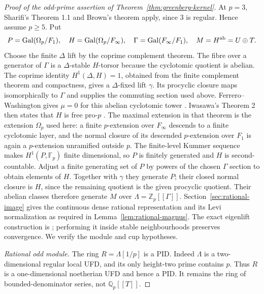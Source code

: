 \documentclass[11pt]{article}
\theoremstyle{definition}
\numberwithin{equation}{section}
\begin{document}
\begin{proof}[Proof of the odd-prime assertion of Theorem~\ref{thm:greenberg-kernel}]
At $p=3$, Sharifi's Theorem 1.1 and Brown's theorem apply, since $3$ is regular. Hence
assume $p\ge5$. Put
\begin{equation}
 P=\operatorname{Gal}(\Omega_p/F_1),\quad
 H=\operatorname{Gal}(\Omega_p/F_\infty),\quad
 \Gamma=\operatorname{Gal}(F_\infty/F_1),\quad
 M=H^{\rm ab}=U\oplus T.
\end{equation}
Choose the finite $\Delta$ lift by the coprime complement theorem.
The fibre over a generator of $\Gamma$ is a $\Delta$-stable
$H$-torsor because the cyclotomic quotient is abelian.
The coprime identity $H^1(\Delta,H)=1$, obtained from the finite
complement theorem and compactness, gives a $\Delta$-fixed lift
$\gamma$. Its procyclic closure maps isomorphically to $\Gamma$
and supplies the commuting section used above.
Ferrero--Washington gives $\mu=0$ for this abelian cyclotomic tower
\cite{FerreroWashington1979}. Iwasawa's Theorem 2 then states that
$H$ is free pro-$p$ \cite[p.~273]{Iwasawa1981}.
The maximal extension in that theorem is the extension $\Omega_p$
used here: a finite $p$-extension over $F_\infty$ descends to a finite
cyclotomic layer, and the normal closure of its descended
$p$-extension over $F_1$ is again a $p$-extension unramified outside
$p$.
The finite-level Kummer sequence makes $H^1(P,\mathbb F_p)$
finite dimensional, so $P$ is finitely generated and $H$ is
second-countable. Adjust a finite generating set of $P$ by powers
of the chosen $\Gamma$ section to obtain elements of $H$.
Together with $\gamma$ they generate $P$; their closed normal
closure is $H$, since the remaining quotient is the given
procyclic quotient. Their abelian classes therefore generate $M$
over $\Lambda=\mathbb Z_p[[\Gamma]]$.
Section~\ref{sec:rational-image} gives the continuous dense rational
representation and its Levi normalization as required in
Lemma~\ref{lem:rational-magnus}. The exact eigenlift construction
is \cite[Lemma~4, p.~3 of arXiv:math/0104116v2]{Sharifi2002}; performing it inside
stable neighbourhoods preserves convergence. We verify the module and cup hypotheses.

\emph{Rational odd module.}
The ring $R=\Lambda[1/p]$ is a PID. Indeed $\Lambda$ is a
two-dimensional regular local UFD, and its only height-two prime
contains $p$. Thus $R$ is a one-dimensional noetherian UFD and
hence a PID. It remains the ring of bounded-denominator series,
not $\mathbb Q_p[[T]]$.


\end{proof}
\end{document}
